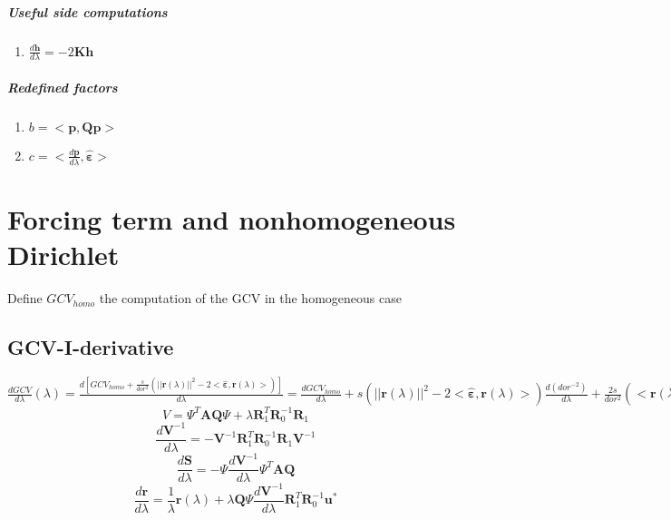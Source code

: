 \documentclass[11pt,twoside]{report}
\begin{document}
\paragraph{Useful side computations}
\begin{enumerate}
	\item $ \frac{d\mathbold{h}}{d\lambda} = -2\textbf{K} \textbf{h}$
\end{enumerate}

\paragraph{Redefined factors}
\begin{enumerate}
	\item $b = <\mathbold{p},\mathbold{Q}\mathbold{p}>$
	\item $c = <\frac{d\mathbold{p}}{d\lambda}, \hat{\mathbold{\varepsilon}}> $
\end{enumerate}


\chapter{Forcing term and nonhomogeneous Dirichlet}
Define $GCV_{homo}$ the computation of the GCV in the homogeneous case
\section{GCV-I-derivative}
$ \frac{dGCV}{d\lambda}(\lambda)=\frac{d[GCV_{homo}+\frac{s}{dor^2}(||\textbf{r}(\lambda)||^2-2<\hat{\mathbold{\varepsilon}},\textbf{r}(\lambda)>)]}{d\lambda}=\frac{dGCV_{homo}}{d\lambda}+s(||\textbf{r}(\lambda)||^2-2<\hat{\mathbold{\varepsilon}},\textbf{r}(\lambda)>)\frac{d(dor^{-2})}{d\lambda}+\frac{2s}{dor^2}(<\textbf{r}(\lambda),\frac{d\textbf{r}}{d\lambda}>-<\frac{d\hat{\mathbold{\varepsilon}}}{d\lambda},\textbf{r}(\lambda)>-<\hat{\mathbold{\varepsilon}},\frac{d\textbf{r}(\lambda)}{d\lambda}>)$\\
\begin{equation}
V=\Psi^T\textbf{AQ}\Psi+\lambda \textbf{R}_1^T\textbf{R}_0^{-1}\textbf{R}_1
\end{equation}
\begin{equation}
\frac{d\textbf{V}^{-1}}{d\lambda}=-\textbf{V}^{-1}\textbf{R}_1^T\textbf{R}_0^{-1}\textbf{R}_1 \textbf{V}^{-1}
\end{equation}
\begin{equation}
\frac{d\textbf{S}}{d\lambda}=-\Psi \frac{d\textbf{V}^{-1}}{d\lambda}\Psi^T\textbf{AQ}
\end{equation}
\begin{equation}
\frac{d\textbf{r}}{d\lambda}=\frac{1}{\lambda}\textbf{r}(\lambda)+\lambda \textbf{Q}\Psi \frac{d\textbf{V}^{-1}}{d\lambda} \textbf{R}_1^T\textbf{R}_0^{-1}\textbf{u}^{*}
\end{equation}
\end{document}
